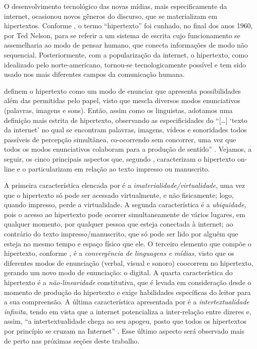 \documentclass{textolivre}
\begin{document}
O desenvolvimento tecnológico das novas mídias, mais especificamente da internet, ocasionou novos gêneros do discurso, que se materializam em hipertextos. Conforme \textcite{xavier_desafio_2015}, o termo “hipertexto” foi cunhado, no final dos anos 1960, por Ted Nelson, para se referir a um sistema de escrita cujo funcionamento se assemelharia ao modo de pensar humano, que conecta informações de modo não sequencial. Posteriormente, com a popularização da internet, o hipertexto, como idealizado pelo norte-americano, tornou-se tecnologicamente possível e tem sido usado nos mais diferentes campos da comunicação humana.

\textcite{araujo_consideracoes_2009} definem o hipertexto como um modo de enunciar que apresenta possibilidades além das permitidas pelo papel, visto que mescla diversos modos enunciativos (palavras, imagens e sons). Então, assim como os linguistas, adotamos uma definição mais estrita de hipertexto, observando as especificidades do “[…] ‘texto da internet’ no qual se encontram palavras, imagens, vídeos e sonoridades todos passíveis de percepção simultânea, co-ocorrendo sem concorrer, uma vez que todos os modos enunciativos colaboram para a produção de sentido” \cite[p. 79]{xavier_desafio_2015}. Vejamos, a seguir, os cinco principais aspectos que, segundo \textcite{xavier_desafio_2015}, caracterizam o hipertexto on-line e o particularizam em relação ao texto impresso ou manuscrito.

A primeira característica elencada por \textcite{xavier_desafio_2015} é a \textit{imaterialidade/virtualidade}, uma vez que o hipertexto só pode ser acessado virtualmente, e não fisicamente; logo, quando impresso, perde a virtualidade. A segunda característica é a \textit{ubiquidade}, pois o acesso ao hipertexto pode ocorrer simultaneamente de vários lugares, em qualquer momento, por qualquer pessoa que esteja conectada à internet; ao contrário do texto impresso/manuscrito, que só pode ser lido por alguém que esteja no mesmo tempo e espaço físico que ele. O terceiro elemento que compõe o hipertexto, conforme \textcite{xavier_desafio_2015}, é a \textit{convergência de linguagens e mídias}, visto que os diferentes modos de enunciação (verbal, visual e sonoro) coocorrem no hipertexto, gerando um novo modo de enunciação: o digital. A quarta característica do hipertexto é a \textit{não-linearidade} constitutiva, que é levada em consideração desde o momento de produção do hipertexto e exige habilidades específicas do leitor para a sua compreensão. A última característica apresentada por \textcite{xavier_desafio_2015} é a \textit{intertextualidade infinita}, tendo em vista que a internet potencializa a inter-relação entre dizeres e, assim, “a intertextualidade chega ao seu apogeu, posto que todos os hipertextos por princípio se cruzam na Internet” \cite[p. 82]{xavier_desafio_2015}. Esse último aspecto será observado mais de perto nas próximas seções deste trabalho.
\end{document}
